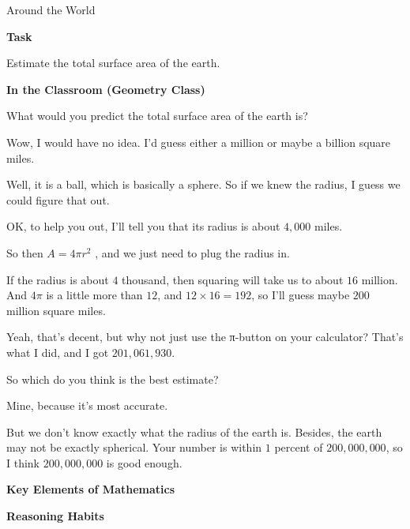 \TriExample
  {Around the World}
  {
    \textbf{Task}

    Estimate the total surface area of the earth.

    \textbf{In the Classroom (Geometry Class)}

    \begin{scriptlist}
      \item [Teacher:] What would you predict the total surface area of the earth is?
      
      \item [Student 1:] Wow, I would have no idea. I'd guess either a million or maybe a billion square miles.
      
      \item [Student 2:] Well, it is a ball, which is basically a sphere. So if we knew the radius, I guess we could figure that out.
      
      \item [Teacher:] OK, to help you out, I'll tell you that its radius is about $4,000$ miles.
      
      \item [Student 2:] So then $A = 4\pi r^2$ , and we just need to plug the radius in.
      
      \item [Student 3:] If the radius is about $4$ thousand, then squaring will take us to about $16$ million. And $4\pi$ is a little more than $12$, and $12 \times 16 = 192$, so I'll guess maybe $200$ million square miles.
      
      \item [Student 4:] Yeah, that's decent, but why not just use the π-button on your calculator? That's what I did, and I got $201,061,930$.
      
      \item [Teacher:] So which do you think is the best estimate?
      
      \item [Student 4:] Mine, because it's most accurate.
      
      \item [Student 3:] But we don't know exactly what the radius of the earth is. Besides, the earth may not be exactly spherical. Your number is within $1$ percent of $200,000,000$, so I think $200,000,000$ is good enough.
    \end{scriptlist}\vspace{\baselineskip}

    \textbf{Key Elements of Mathematics}

    \begin{hanglist}
    \end{hanglist}

    \textbf{Reasoning Habits}

    \begin{hanglist}
      
    \end{hanglist}
  }
